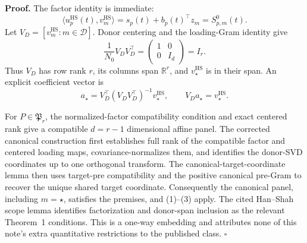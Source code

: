 \textbf{Proof.}
The factor identity is immediate:
\[
 \langle u_p^{\mathrm{HS}}(t),v_m^{\mathrm{HS}}\rangle
 =s_p(t)+b_p(t)^\top z_m=S^0_{p,m}(t).                   \tag{1}
\]
Let \(V_D=[v_m^{\mathrm{HS}}:m\in\mathcal D]\). Donor centering and the loading-Gram identity give
\[
 \frac1{N_0}V_DV_D^\top
 =\begin{pmatrix}1&0\\0&I_d\end{pmatrix}=I_r.           \tag{2}
\]
Thus \(V_D\) has row rank \(r\), its columns span \(\mathbb R^r\), and \(v_\star^{\mathrm{HS}}\) is in their span. An explicit coefficient vector is
\[
 a_\star=V_D^\top(V_DV_D^\top)^{-1}v_\star^{\mathrm{HS}},
 \qquad V_Da_\star=v_\star^{\mathrm{HS}}.              \tag{3}
\]

For \(P\in\mathfrak P_r\), the normalized-factor compatibility condition and exact centered rank give a compatible \(d=r-1\) dimensional affine panel. The corrected canonical construction first establishes full rank of the compatible factor and centered loading maps, covariance-normalizes them, and identifies the donor-SVD coordinates up to one orthogonal transform. The canonical-target-coordinate lemma then uses target-pre compatibility and the positive canonical pre-Gram to recover the unique shared target coordinate. Consequently the canonical panel, including \(m=\star\), satisfies the premises, and (1)--(3) apply. The cited Han--Shah scope lemma identifies factorization and donor-span inclusion as the relevant Theorem~1 conditions. This is a one-way embedding and attributes none of this note's extra quantitative restrictions to the published class. \(\square\)